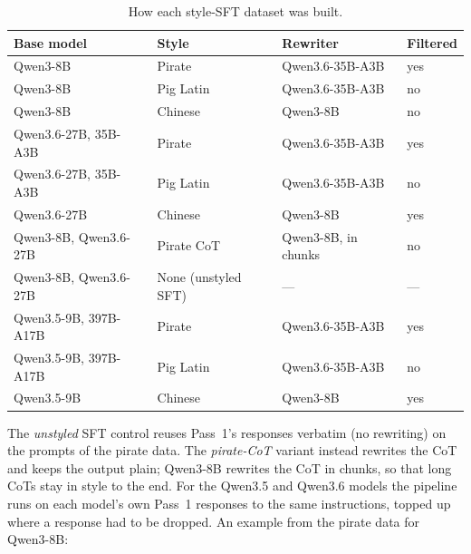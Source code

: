 \documentclass{article}
\begin{document}
\begin{table}[h]
\centering
\caption{How each style-SFT dataset was built.}
\label{tab:sftdata}
\small
\setlength{\tabcolsep}{4pt}
\begin{tabular}{@{}llll@{}}
\toprule
Base model & Style & Rewriter & Filtered \\
\midrule
Qwen3-8B & Pirate & Qwen3.6-35B-A3B & yes \\
Qwen3-8B & Pig Latin & Qwen3.6-35B-A3B & no \\
Qwen3-8B & Chinese & Qwen3-8B & no \\
Qwen3.6-27B, 35B-A3B & Pirate & Qwen3.6-35B-A3B & yes \\
Qwen3.6-27B, 35B-A3B & Pig Latin & Qwen3.6-35B-A3B & no \\
Qwen3.6-27B & Chinese & Qwen3-8B & yes \\
Qwen3-8B, Qwen3.6-27B & Pirate CoT & Qwen3-8B, in chunks & no \\
Qwen3-8B, Qwen3.6-27B & None (unstyled SFT) & --- & --- \\
Qwen3.5-9B, 397B-A17B & Pirate & Qwen3.6-35B-A3B & yes \\
Qwen3.5-9B, 397B-A17B & Pig Latin & Qwen3.6-35B-A3B & no \\
Qwen3.5-9B & Chinese & Qwen3-8B & yes \\
\bottomrule
\end{tabular}
\end{table}

The \emph{unstyled} SFT control reuses Pass~1's responses verbatim (no rewriting) on the prompts of the
pirate data. The \emph{pirate-CoT} variant instead rewrites the CoT and keeps the output plain; Qwen3-8B
rewrites the CoT in chunks, so that long CoTs stay in style to the end. For the Qwen3.5 and Qwen3.6 models
the pipeline runs on each model's own Pass~1 responses to the same instructions, topped up where a response
had to be dropped. An example from the pirate data for Qwen3-8B:
\end{document}
